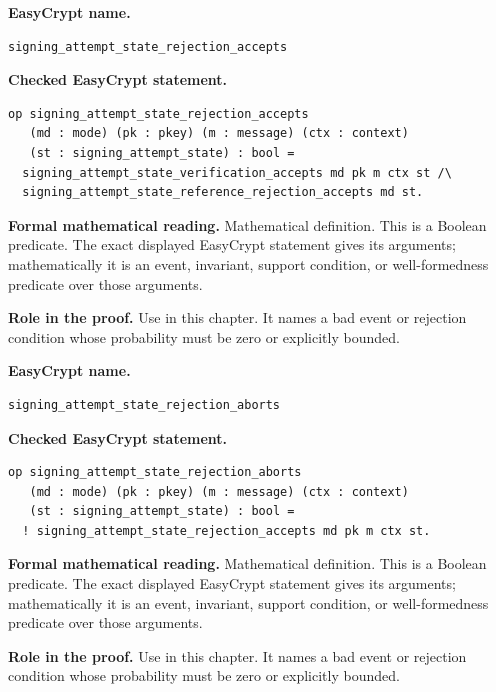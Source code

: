 \begin{formaldefinition}
\noindent\textbf{EasyCrypt name.}
\begin{lstlisting}[language=EasyCrypt,basicstyle=\ttfamily\scriptsize]
signing_attempt_state_rejection_accepts
\end{lstlisting}
\noindent\textbf{Checked EasyCrypt statement.}
\begin{lstlisting}[language=EasyCrypt,basicstyle=\ttfamily\scriptsize]
op signing_attempt_state_rejection_accepts
   (md : mode) (pk : pkey) (m : message) (ctx : context)
   (st : signing_attempt_state) : bool =
  signing_attempt_state_verification_accepts md pk m ctx st /\
  signing_attempt_state_reference_rejection_accepts md st.
\end{lstlisting}
\noindent\textbf{Formal mathematical reading.}
Mathematical definition. This is a Boolean predicate.  The exact displayed EasyCrypt statement gives its arguments; mathematically it is an event, invariant, support condition, or well-formedness predicate over those arguments.

\noindent\textbf{Role in the proof.}
Use in this chapter. It names a bad event or rejection condition whose probability must be zero or explicitly bounded.

\end{formaldefinition}

\begin{formaldefinition}
\noindent\textbf{EasyCrypt name.}
\begin{lstlisting}[language=EasyCrypt,basicstyle=\ttfamily\scriptsize]
signing_attempt_state_rejection_aborts
\end{lstlisting}
\noindent\textbf{Checked EasyCrypt statement.}
\begin{lstlisting}[language=EasyCrypt,basicstyle=\ttfamily\scriptsize]
op signing_attempt_state_rejection_aborts
   (md : mode) (pk : pkey) (m : message) (ctx : context)
   (st : signing_attempt_state) : bool =
  ! signing_attempt_state_rejection_accepts md pk m ctx st.
\end{lstlisting}
\noindent\textbf{Formal mathematical reading.}
Mathematical definition. This is a Boolean predicate.  The exact displayed EasyCrypt statement gives its arguments; mathematically it is an event, invariant, support condition, or well-formedness predicate over those arguments.

\noindent\textbf{Role in the proof.}
Use in this chapter. It names a bad event or rejection condition whose probability must be zero or explicitly bounded.

\end{formaldefinition}

